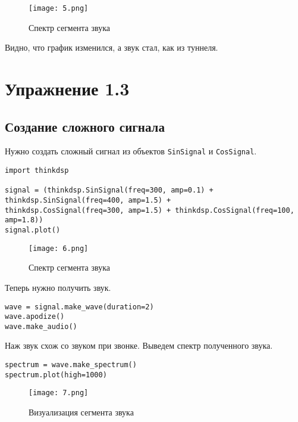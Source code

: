 \documentclass[a4paper,12pt]{report}
\begin{document}
\begin{figure}[H]
        \centering
        \texttt{[image: 5.png]}
        \caption{Спектр сегмента звука}
        \label{fig:fig2_5}
\end{figure}

Видно, что график изменился, а звук стал, как из туннеля.

\chapter{Упражнение 1.3}
\section{Создание сложного сигнала}

Нужно создать сложный сигнал из объектов \texttt{SinSignal} и \texttt{CosSignal}.

\begin{lstlisting}[caption=Создание сложного сигнала из 4 элементов]
import thinkdsp

signal = (thinkdsp.SinSignal(freq=300, amp=0.1) + thinkdsp.SinSignal(freq=400, amp=1.5) +
thinkdsp.CosSignal(freq=300, amp=1.5) + thinkdsp.CosSignal(freq=100, amp=1.8))
signal.plot()
\end{lstlisting}

\begin{figure}[H]
        \centering
        \texttt{[image: 6.png]}
        \caption{Спектр сегмента звука}
        \label{fig:fig3_1}
\end{figure}

Теперь нужно получить звук.

\begin{lstlisting}[caption=Воспроизведение сложного сигнала]
wave = signal.make_wave(duration=2)
wave.apodize()
wave.make_audio()
\end{lstlisting}

Наж звук схож со звуком при звонке. Выведем спектр полученного звука.

\begin{lstlisting}[caption=Визуализация сигнала]
spectrum = wave.make_spectrum()
spectrum.plot(high=1000)
\end{lstlisting}

\begin{figure}[H]
        \centering
        \texttt{[image: 7.png]}
        \caption{Визуализация сегмента звука}
        \label{fig:fig3_2}
\end{figure}
\end{document}
